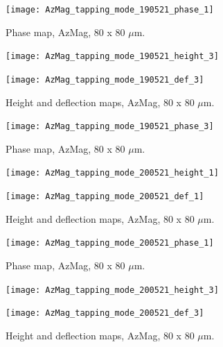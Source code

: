\begin{figure}[H]
\centering
  \texttt{[image: AzMag\_tapping\_mode\_190521\_phase\_1]}
\caption[Phase map, AzMag]{Phase map, AzMag, 80 x 80 $\mu$m.}
\label{fig:afm_azmag_phase_2}
\end{figure}


\begin{figure}[H]
\centering
\begin{minipage}{.45\textwidth}
  \centering
  \texttt{[image: AzMag\_tapping\_mode\_190521\_height\_3]}
\end{minipage}
\begin{minipage}{.45\textwidth}
  \centering
  \texttt{[image: AzMag\_tapping\_mode\_190521\_def\_3]}
\end{minipage}
\caption[Height and deflection maps, AzMag]{Height and deflection maps, AzMag, 80 x 80 $\mu$m.}
\label{fig:afm_azmag_height_def_3}
\end{figure}

\begin{figure}[H]
\centering
  \texttt{[image: AzMag\_tapping\_mode\_190521\_phase\_3]}
\caption[Phase map, AzMag]{Phase map, AzMag, 80 x 80 $\mu$m.}
\label{fig:afm_azmag_phase_3}
\end{figure}


\begin{figure}[H]
\centering
\begin{minipage}{.45\textwidth}
  \centering
  \texttt{[image: AzMag\_tapping\_mode\_200521\_height\_1]}
\end{minipage}
\begin{minipage}{.45\textwidth}
  \centering
  \texttt{[image: AzMag\_tapping\_mode\_200521\_def\_1]}
\end{minipage}
\caption[Height and deflection maps, AzMag]{Height and deflection maps, AzMag, 80 x 80 $\mu$m.}
\label{fig:afm_azmag_height_def_4}
\end{figure}

\begin{figure}[H]
\centering
  \texttt{[image: AzMag\_tapping\_mode\_200521\_phase\_1]}
\caption[Phase map, AzMag]{Phase map, AzMag, 80 x 80 $\mu$m.}
\label{fig:afm_azmag_phase_4}
\end{figure}


\begin{figure}[H]
\centering
\begin{minipage}{.45\textwidth}
  \centering
  \texttt{[image: AzMag\_tapping\_mode\_200521\_height\_3]}
\end{minipage}
\begin{minipage}{.45\textwidth}
  \centering
  \texttt{[image: AzMag\_tapping\_mode\_200521\_def\_3]}
\end{minipage}
\caption[Height and deflection maps, AzMag]{Height and deflection maps, AzMag, 80 x 80 $\mu$m.}
\label{fig:afm_azmag_height_def_5}
\end{figure}

